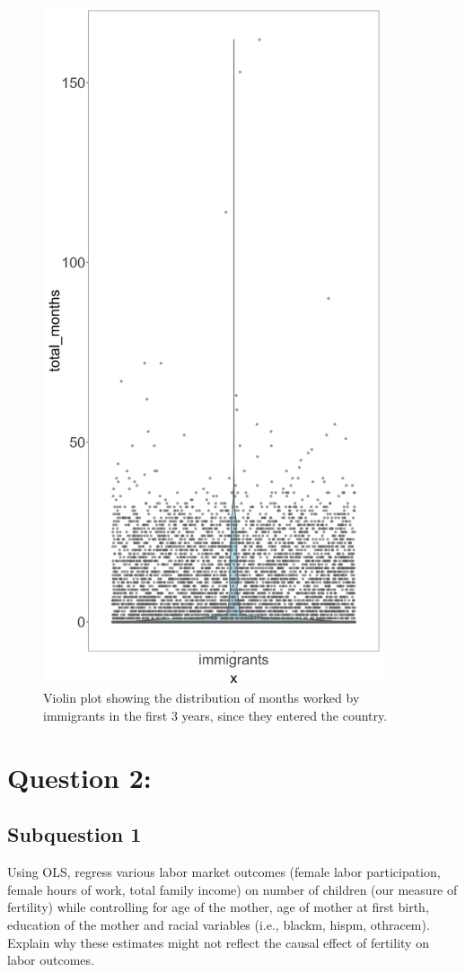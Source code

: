 \documentclass{article}
\begin{document}
	\begin{figure}[H]\centering
		\includegraphics[width=10cm]{total_months_per_pers_violin_plot}
		\caption{Violin plot showing the distribution of months worked by immigrants in the first 3 years, since they entered the country.}
		\label{fig:total_months_per_pers_violin_plot}
	\end{figure}
	
	\section{Question 2:}
	\subsection{Subquestion 1}
	Using OLS, regress various labor market outcomes (female labor participation, female hours of work, total family income) on number of children (our measure of fertility) while controlling for age of the mother, age of mother at first birth, education of the mother and racial variables (i.e., blackm, hispm, othracem). Explain
	why these estimates might not reflect the causal effect of fertility on labor outcomes.
\end{document}
